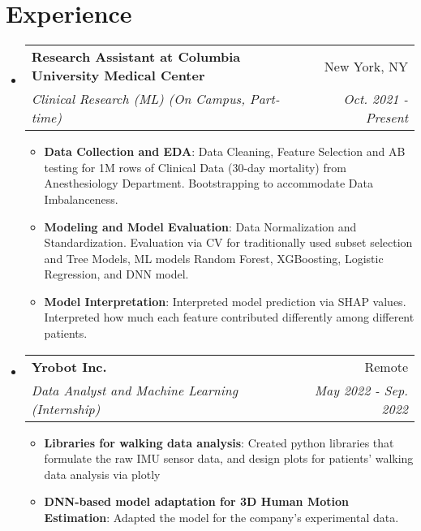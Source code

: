 \documentclass[a4paper,20pt]{article}
\makeatletter
\newcommand{\resumeItem}[2]{
  \item\small{
    \textbf{#1}{: #2 \vspace{-2pt}}
  }
}
\newcommand{\resumeSubheading}[4]{
  \vspace{-1pt}\item
    \begin{tabular*}{0.97\textwidth}{l@{\extracolsep{\fill}}r}
      \textbf{#1} & #2 \\
      \textit{#3} & \textit{#4} \\
    \end{tabular*}\vspace{-5pt}
}
\newcommand{\resumeSubHeadingListStart}{\begin{itemize}[leftmargin=*]}
\newcommand{\resumeSubHeadingListEnd}{\end{itemize}}
\newcommand{\resumeItemListStart}{\begin{itemize}}
\newcommand{\resumeItemListEnd}{\end{itemize}\vspace{-5pt}}
\makeatother
\begin{document}
\section{Experience}
  \resumeSubHeadingListStart
    \resumeSubheading{Research Assistant at Columbia University Medical Center}{New York, NY}
    {Clinical Research (ML) (On Campus, Part-time)}{Oct. 2021 - Present}
    \resumeItemListStart
        \resumeItem{Data Collection and EDA}
          {Data Cleaning, Feature Selection and AB testing for 1M rows of Clinical Data (30-day mortality) from Anesthesiology Department. Bootstrapping to accommodate Data Imbalanceness.}
          \resumeItem{Modeling and Model Evaluation}
          {Data Normalization and Standardization. Evaluation via CV for traditionally used subset selection and Tree Models, ML models Random Forest, XGBoosting, Logistic Regression, and DNN model.}
          \resumeItem{Model Interpretation}{Interpreted model prediction via SHAP values. Interpreted how much each feature contributed differently among different patients.}
      \resumeItemListEnd
\vspace{-5pt}
    \resumeSubheading
		{Yrobot Inc.}{Remote}
		{Data Analyst and Machine Learning (Internship)}{May 2022 -  Sep. 2022}
		\resumeItemListStart
        \resumeItem{Libraries for walking data analysis}
          {Created python libraries that formulate the raw IMU sensor data, and design plots for patients' walking data analysis via plotly}
        \resumeItem{DNN-based model adaptation for 3D Human Motion Estimation}
          {Adapted the model for the company's experimental data.}
		\resumeItemListEnd

\resumeSubHeadingListEnd

\vspace{-5pt}
\end{document}
